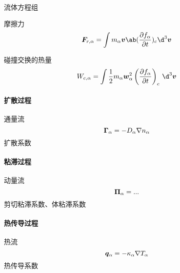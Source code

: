 流体方程组

摩擦力
\begin{equation}
\vector{F}_{r,\alpha} = \int m_\alpha \vector{v} \ab(\pdv{f_\alpha}{t})_c \d^3\vector{v}
\end{equation}

碰撞交换的热量
\begin{equation}
W_{c,\alpha} = \int \frac{1}{2} m_\alpha \vector{w}_\alpha^2 \left( \pDeriv{f_\alpha}{t} \right)_c \, \d^3 \vector{v}
\end{equation}

\paragraph{扩散过程}
通量流
\begin{equation}
\bm{\Gamma}_\alpha = - D_\alpha \nabla {n_\alpha}
\end{equation}
扩散系数

\paragraph{粘滞过程}
动量流
\begin{equation}
\bm{\Pi}_\alpha = ...
\end{equation}
剪切粘滞系数、体粘滞系数

\paragraph{热传导过程}
热流
\begin{equation}
\bm{q}_\alpha = - \kappa_\alpha \nabla {T_\alpha}
\end{equation}
热传导系数
